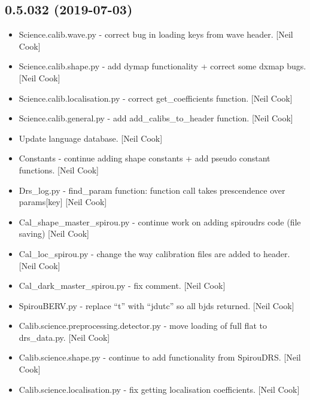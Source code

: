 \documentclass[a4paper,10pt,english]{report}
\begin{document}
\subsection{0.5.032 (2019-07-03)}
\label{\detokenize{misc/changelog:id105}}\begin{itemize}
\item {} 
Science.calib.wave.py - correct bug in loading keys from wave header.
{[}Neil Cook{]}

\item {} 
Science.calib.shape.py - add dymap functionality + correct some dxmap
bugs. {[}Neil Cook{]}

\item {} 
Science.calib.localisation.py - correct get\_coefficients function.
{[}Neil Cook{]}

\item {} 
Science.calib.general.py - add add\_calibs\_to\_header function. {[}Neil
Cook{]}

\item {} 
Update language database. {[}Neil Cook{]}

\item {} 
Constants - continue adding shape constants + add pseudo constant
functions. {[}Neil Cook{]}

\item {} 
Drs\_log.py - find\_param function: function call takes prescendence
over params{[}key{]} {[}Neil Cook{]}

\item {} 
Cal\_shape\_master\_spirou.py - continue work on adding spiroudrs code
(file saving) {[}Neil Cook{]}

\item {} 
Cal\_loc\_spirou.py - change the way calibration files are added to
header. {[}Neil Cook{]}

\item {} 
Cal\_dark\_master\_spirou.py - fix comment. {[}Neil Cook{]}

\item {} 
SpirouBERV.py - replace “t” with “jdutc” so all bjds returned. {[}Neil
Cook{]}

\item {} 
Calib.science.preprocessing.detector.py - move loading of full flat to
drs\_data.py. {[}Neil Cook{]}

\item {} 
Calib.science.shape.py - continue to add functionality from SpirouDRS.
{[}Neil Cook{]}

\item {} 
Calib.science.localisation.py - fix getting localisation coefficients.
{[}Neil Cook{]}


\end{itemize}
\end{document}
